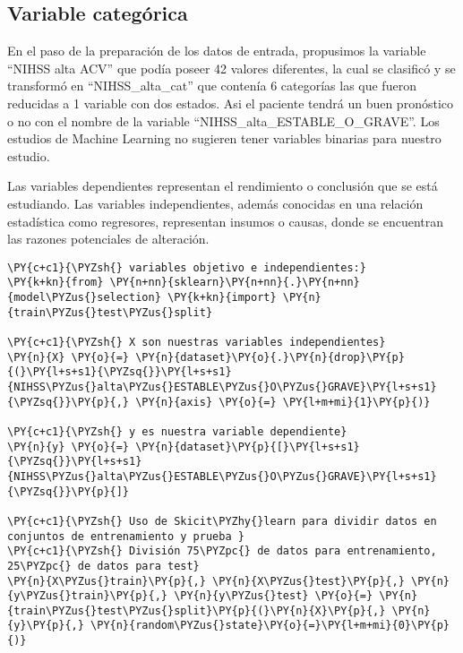     \hypertarget{variable-categuxf3rica}{%
\subsection{Variable categórica}\label{variable-categuxf3rica}}

En el paso de la preparación de los datos de entrada, propusimos la
variable ``NIHSS alta ACV'' que podía poseer 42 valores diferentes, la
cual se clasificó y se transformó en ``NIHSS\_alta\_cat'' que contenía 6
categorías las que fueron reducidas a 1 variable con dos estados. Asi el
paciente tendrá un buen pronóstico o no con el nombre de la variable
``NIHSS\_alta\_ESTABLE\_O\_GRAVE''. Los estudios de Machine Learning no
sugieren tener variables binarias para nuestro estudio.

Las variables dependientes representan el rendimiento o conclusión que
se está estudiando. Las variables independientes, además conocidas en
una relación estadística como regresores, representan insumos o causas,
donde se encuentran las razones potenciales de alteración.

    \begin{tcolorbox}[breakable, size=fbox, boxrule=1pt, pad at break*=1mm,colback=cellbackground, colframe=cellborder]
\begin{Verbatim}[commandchars=\\\{\}]
\PY{c+c1}{\PYZsh{} variables objetivo e independientes:}
\PY{k+kn}{from} \PY{n+nn}{sklearn}\PY{n+nn}{.}\PY{n+nn}{model\PYZus{}selection} \PY{k+kn}{import} \PY{n}{train\PYZus{}test\PYZus{}split}

\PY{c+c1}{\PYZsh{} X son nuestras variables independientes}
\PY{n}{X} \PY{o}{=} \PY{n}{dataset}\PY{o}{.}\PY{n}{drop}\PY{p}{(}\PY{l+s+s1}{\PYZsq{}}\PY{l+s+s1}{NIHSS\PYZus{}alta\PYZus{}ESTABLE\PYZus{}O\PYZus{}GRAVE}\PY{l+s+s1}{\PYZsq{}}\PY{p}{,} \PY{n}{axis} \PY{o}{=} \PY{l+m+mi}{1}\PY{p}{)}

\PY{c+c1}{\PYZsh{} y es nuestra variable dependiente}
\PY{n}{y} \PY{o}{=} \PY{n}{dataset}\PY{p}{[}\PY{l+s+s1}{\PYZsq{}}\PY{l+s+s1}{NIHSS\PYZus{}alta\PYZus{}ESTABLE\PYZus{}O\PYZus{}GRAVE}\PY{l+s+s1}{\PYZsq{}}\PY{p}{]}

\PY{c+c1}{\PYZsh{} Uso de Skicit\PYZhy{}learn para dividir datos en conjuntos de entrenamiento y prueba }
\PY{c+c1}{\PYZsh{} División 75\PYZpc{} de datos para entrenamiento, 25\PYZpc{} de datos para test}
\PY{n}{X\PYZus{}train}\PY{p}{,} \PY{n}{X\PYZus{}test}\PY{p}{,} \PY{n}{y\PYZus{}train}\PY{p}{,} \PY{n}{y\PYZus{}test} \PY{o}{=} \PY{n}{train\PYZus{}test\PYZus{}split}\PY{p}{(}\PY{n}{X}\PY{p}{,} \PY{n}{y}\PY{p}{,} \PY{n}{random\PYZus{}state}\PY{o}{=}\PY{l+m+mi}{0}\PY{p}{)}
\end{Verbatim}
\end{tcolorbox}

